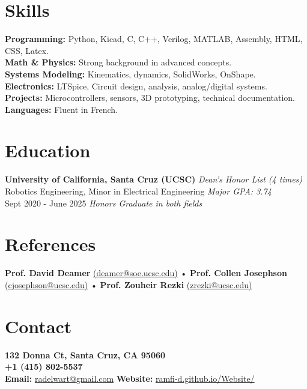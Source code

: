 \documentclass[a4paper,9pt]{article}
\begin{document}
\section*{Skills}
\small
\textbf{Programming:} Python, Kicad, C, C++, Verilog, MATLAB, Assembly, HTML, CSS, Latex. \\
\textbf{Math \& Physics:} Strong background in advanced concepts. \\
\textbf{Systems Modeling:} Kinematics, dynamics, SolidWorks, OnShape. \\
\textbf{Electronics:} LTSpice, Circuit design, analysis, analog/digital systems. \\
\textbf{Projects:} Microcontrollers, sensors, 3D prototyping, technical documentation. \\
\textbf{Languages:} Fluent in French.
\normalsize

\section*{Education}
\small
\textbf{University of California, Santa Cruz (UCSC)} \hfill \textit{Dean's Honor List (4 times)} \\
Robotics Engineering, Minor in Electrical Engineering \hfill \textit{Major GPA: 3.74} \\
Sept 2020 - June 2025 \hfill \textit{Honors Graduate in both fields}

\section*{References}
\footnotesize
\textbf{Prof. David Deamer} \href{mailto:deamer@soe.ucsc.edu}{(deamer@soe.ucsc.edu)} • \textbf{Prof. Collen Josephson} \href{mailto:cjosephson@ucsc.edu}{(cjosephson@ucsc.edu)} • \textbf{Prof. Zouheir Rezki} \href{mailto:zrezki@ucsc.edu}{(zrezki@ucsc.edu)}
\normalsize

\section*{Contact}
\textbf{132 Donna Ct, Santa Cruz, CA 95060} \\
\textbf{+1 (415) 802-5537} \\
\textbf{Email:} \href{mailto:radelwart@gmail.com}{radelwart@gmail.com}\normalsize
\textbf{Website:} \href{https://ramfi-d.github.io/Website/}{ramfi-d.github.io/Website/}
\normalsize
\end{document}

